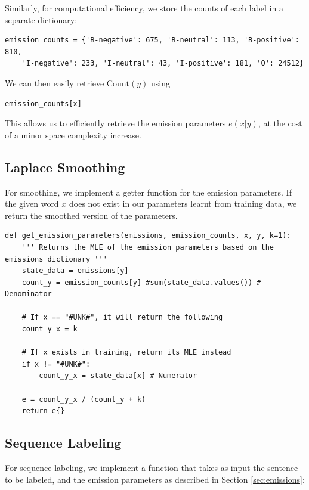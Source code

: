 \documentclass{article}
\numberwithin{equation}{section}
\begin{document}
Similarly, for computational efficiency, we store the counts of each label in a separate dictionary:

\begin{verbatim}
emission_counts = {'B-negative': 675, 'B-neutral': 113, 'B-positive': 810,
    'I-negative': 233, 'I-neutral': 43, 'I-positive': 181, 'O': 24512}
\end{verbatim}

We can then easily retrieve $\text{Count}(y)$ using

\begin{verbatim}emission_counts[x]\end{verbatim}

This allows us to efficiently retrieve the emission parameters $e(x|y)$, at the cost of a minor space complexity increase.

\subsection{Laplace Smoothing}

For smoothing, we implement a getter function for the emission parameters. If the given word $x$ does not exist in our parameters learnt from training data, we return the smoothed version of the parameters.

\begin{verbatim}
def get_emission_parameters(emissions, emission_counts, x, y, k=1):
    ''' Returns the MLE of the emission parameters based on the emissions dictionary '''
    state_data = emissions[y]
    count_y = emission_counts[y] #sum(state_data.values()) # Denominator
    
    # If x == "#UNK#", it will return the following
    count_y_x = k
    
    # If x exists in training, return its MLE instead
    if x != "#UNK#":
        count_y_x = state_data[x] # Numerator
    
    e = count_y_x / (count_y + k)
    return e{}
\end{verbatim}

\subsection{Sequence Labeling}

For sequence labeling, we implement a function that takes as input the sentence to be labeled, and the emission parameters as described in Section \ref{sec:emissions}:
\end{document}
